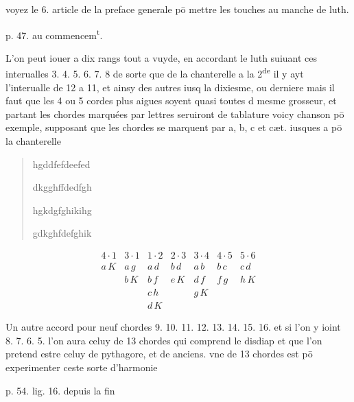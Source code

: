 \documentclass[11pt,a4paper]{article}
\begin{document}
voyez le 6. article de la preface generale pō mettre les touches au manche de luth.

p. 47. au commencem\textsuperscript{t}.

L'on peut iouer a dix rangs tout a vuyde, en accordant le luth suiuant ces interualles 3. 4. 5. 6. 7. 8 \ill{} de sorte que de la chanterelle a la 2\textsuperscript{de} il y ayt l'interualle de 12 a 11, et ainsy des autres iusq\ill{} la dixiesme, ou derniere mais il faut que les 4 ou 5 cordes plus aigues soyent quasi toutes d\ill{} mesme grosseur, et partant les chordes marquées par lettres seruiront de tablature voicy \ill{} chanson pō exemple, supposant que les chordes se marquent par a, b, c et cæt. iusques a \ill{} pō la chanterelle

\begin{quote}
hgddfefdeefed

dkgghffdedfgh

hgkdgfghikihg

gdkghfdefghik
\end{quote}

\[
\begin{array}{c|c|c|c|c|c|c}
4\cdot 1 & 3\cdot 1 & 1\cdot 2 & 2\cdot 3 & 3\cdot 4 & 4\cdot 5 & 5\cdot 6 \\ \hline
a\,K & a\,g & a\,d & b\,d & a\,b & b\,c & c\,d \\
 & b\,K & b\,f & e\,K & d\,f & f\,g & h\,K \\
 & & c\,h & & g\,K & & \\
 & & d\,K & & & &
\end{array}
\]

Un autre accord pour neuf chordes 9. 10. 11. 12. 13. 14. 15. 16. et si l'on y ioint 8. 7. 6. 5. \ill{} l'on aura celuy de 13 chordes qui comprend le disdiap\ill{} et que l'on pretend estre celuy de pythagore, et de anciens. vne  de 13 chordes est \ill{} pō experimenter ceste sorte d'harmonie


p. 54. lig. 16. depuis la fin
\end{document}
